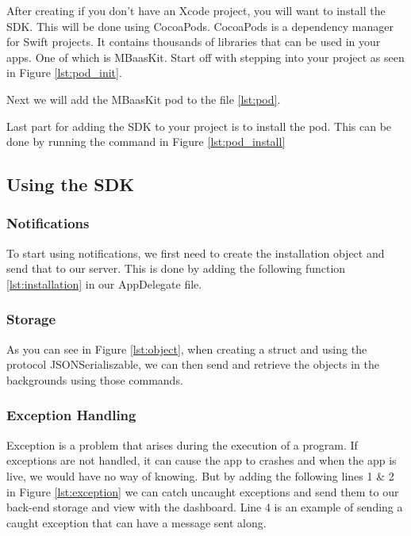 After creating if you don't have an Xcode project, you will want to install the SDK. This will be done using CocoaPods. CocoaPods is a dependency manager for Swift projects. It contains thousands of libraries that can be used in your apps. One of which is MBaasKit. Start off with stepping into your project as seen in Figure \ref{lst:pod_init}.

Next we will add the MBaasKit pod to the file \ref{lst:pod}.



Last part for adding the SDK to your project is to install the pod. This can be done by running the command in Figure \ref{lst:pod_install}




\subsection{Using the SDK}

\subsubsection{Notifications}
To start using notifications, we first need to create the installation object and send that to our server. This is done by adding the following function \ref{lst:installation} in our AppDelegate file.




\subsubsection{Storage}



As you can see in Figure \ref{lst:object}, when creating a struct and using the protocol JSONSerialiszable, we can then send and retrieve the objects in the backgrounds using those commands.


\subsubsection{Exception Handling}

Exception is a problem that arises during the execution of a program. If exceptions are not handled, it can cause the app to crashes and when the app is live, we would have no way of knowing. But by adding the following lines 1 & 2 in Figure \ref{lst:exception} we can catch uncaught exceptions and send them to our back-end storage and view with the dashboard. Line 4 is an example of sending a caught exception that can have a message sent along.

